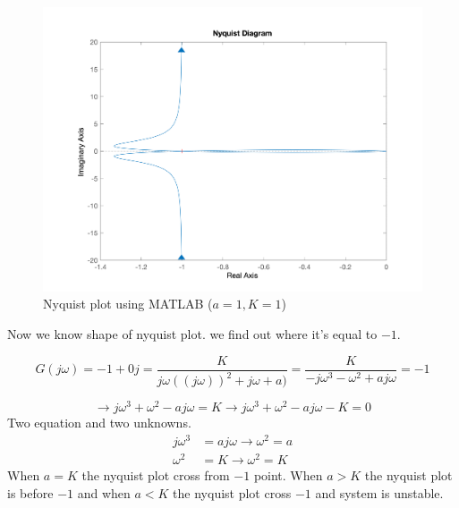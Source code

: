\begin{figure}[H]
	\caption{Nyquist plot using MATLAB ($a = 1, K = 1$)}
	\centering
	\includegraphics[width=12cm]{../Figure/Q2/MATLAB-Nyquist.png}
\end{figure}

Now we know shape of nyquist plot. we find out where it's equal to $-1$.

$$
G(j\omega) = -1 + 0j = \dfrac{K}{j\omega((j\omega))^2 + j\omega + a)} = \dfrac{K}{-j\omega^3 - \omega^2 + aj\omega} = -1
$$

$$
\to j\omega^3 + \omega^2 -aj\omega = K \to j\omega^3 + \omega^2 -aj\omega - K = 0
$$
Two equation and two unknowns.
\begin{align*}
	j\omega^3 &=aj\omega \to \omega^2 = a\\
	\omega^2 &=K \to \omega^2 = K
\end{align*}
When $a = K$ the nyquist plot cross from $-1$ point. When $a>K$ the nyquist plot is before $-1$ and when $a<K$ the nyquist plot cross $-1$ and system is unstable.
 
